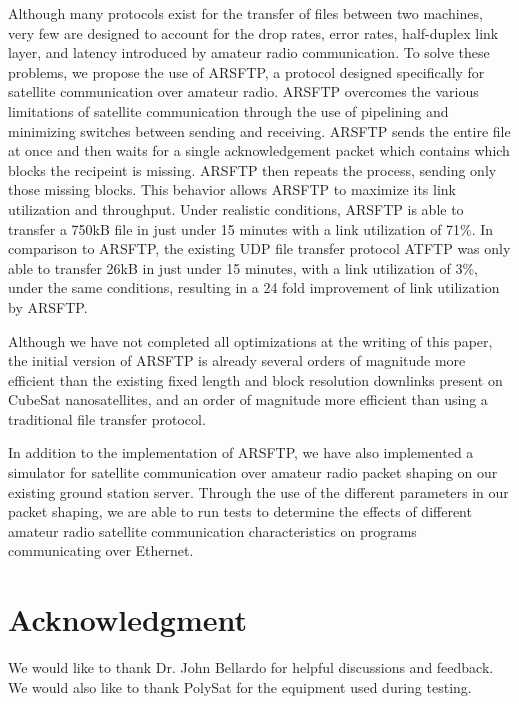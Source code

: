 \documentclass[journal]{./IEEEtran}
\begin{document}
Although many protocols exist for the transfer of files between two machines, very few are designed to account for the drop rates, error rates, half-duplex link layer, and latency introduced by amateur radio communication. To solve these problems, we propose the use of ARSFTP, a protocol designed specifically for satellite communication over amateur radio. ARSFTP overcomes the various limitations of satellite communication through the use of pipelining and minimizing switches between sending and receiving. ARSFTP sends the entire file at once and then waits for a single acknowledgement packet which contains which blocks the recipeint is missing. ARSFTP then repeats the process, sending only those missing blocks. This behavior allows ARSFTP to maximize its link utilization and throughput. Under realistic conditions, ARSFTP is able to transfer a 750kB file in just under 15 minutes with a link utilization of 71\%. In comparison to ARSFTP, the existing UDP file transfer protocol ATFTP was only able to transfer 26kB in just under 15 minutes, with a link utilization of 3\%, under the same conditions, resulting in a 24 fold improvement of link utilization by ARSFTP.  

Although we have not completed all optimizations at the writing of this paper, the initial version of ARSFTP is already several orders of magnitude more efficient than the existing fixed length and block resolution downlinks present on CubeSat nanosatellites, and an order of magnitude more efficient than using a traditional file transfer protocol.

In addition to the implementation of ARSFTP, we have also implemented a simulator for satellite communication over amateur radio packet shaping on our existing ground station server. Through the use of the different parameters in our packet shaping, we are able to run tests to determine the effects of different amateur radio satellite communication characteristics on programs communicating over Ethernet.  

\section{Acknowledgment}
We would like to thank Dr. John Bellardo for helpful discussions and feedback. We would also like to thank PolySat for the equipment used during testing.



\end{document}
